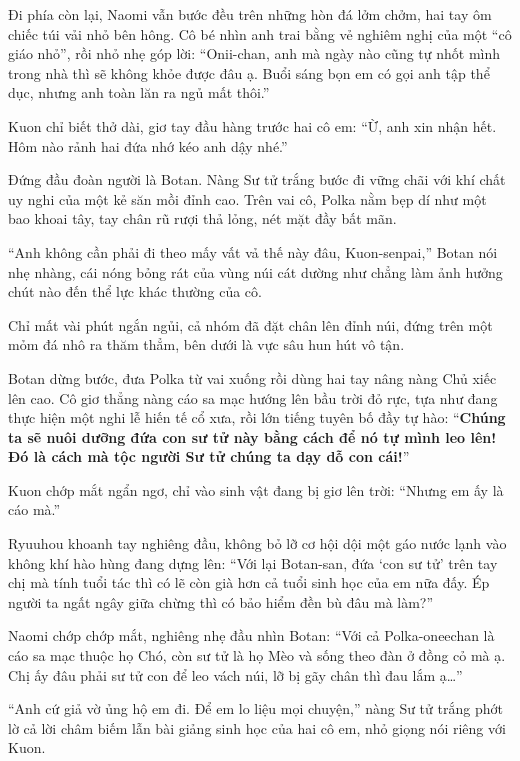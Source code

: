 \documentclass[../main.tex]{subfiles}
\begin{document}
Đi phía còn lại, Naomi vẫn bước đều trên những hòn đá lởm chởm, hai tay ôm chiếc túi vải nhỏ bên hông. Cô bé nhìn anh trai bằng vẻ nghiêm nghị của một ``cô giáo nhỏ'', rồi nhỏ nhẹ góp lời: ``Onii-chan, anh mà ngày nào cũng tự nhốt mình trong nhà thì sẽ không khỏe được đâu ạ. Buổi sáng bọn em có gọi anh tập thể dục, nhưng anh toàn lăn ra ngủ mất thôi.''

Kuon chỉ biết thở dài, giơ tay đầu hàng trước hai cô em: ``Ừ, anh xin nhận hết. Hôm nào rảnh hai đứa nhớ kéo anh dậy nhé.''

Đứng đầu đoàn người là Botan. Nàng Sư tử trắng bước đi vững chãi với khí chất uy nghi của một kẻ săn mồi đỉnh cao. Trên vai cô, Polka nằm bẹp dí như một bao khoai tây, tay chân rũ rượi thả lỏng, nét mặt đầy bất mãn.

``Anh không cần phải đi theo mấy vất vả thế này đâu, Kuon-senpai,'' Botan nói nhẹ nhàng, cái nóng bỏng rát của vùng núi cát dường như chẳng làm ảnh hưởng chút nào đến thể lực khác thường của cô.

Chỉ mất vài phút ngắn ngủi, cả nhóm đã đặt chân lên đỉnh núi, đứng trên một mỏm đá nhô ra thăm thẳm, bên dưới là vực sâu hun hút vô tận.

Botan dừng bước, đưa Polka từ vai xuống rồi dùng hai tay nâng nàng Chủ xiếc lên cao. Cô giơ thẳng nàng cáo sa mạc hướng lên bầu trời đỏ rực, tựa như đang thực hiện một nghi lễ hiến tế cổ xưa, rồi lớn tiếng tuyên bố đầy tự hào: ``\textbf{Chúng ta sẽ nuôi dưỡng đứa con sư tử này bằng cách để nó tự mình leo lên! Đó là cách mà tộc người Sư tử chúng ta dạy dỗ con cái!}''

Kuon chớp mắt ngẩn ngơ, chỉ vào sinh vật đang bị giơ lên trời: ``Nhưng em ấy là cáo mà.''

Ryuuhou khoanh tay nghiêng đầu, không bỏ lỡ cơ hội dội một gáo nước lạnh vào không khí hào hùng đang dựng lên: ``Với lại Botan-san, đứa `con sư tử' trên tay chị mà tính tuổi tác thì có lẽ còn già hơn cả tuổi sinh học của em nữa đấy. Ép người ta ngất ngây giữa chừng thì có bảo hiểm đền bù đâu mà làm?''

Naomi chớp chớp mắt, nghiêng nhẹ đầu nhìn Botan: ``Với cả Polka-oneechan là cáo sa mạc thuộc họ Chó, còn sư tử là họ Mèo và sống theo đàn ở đồng cỏ mà ạ. Chị ấy đâu phải sư tử con để leo vách núi, lỡ bị gãy chân thì đau lắm ạ\dots''

``Anh cứ giả vờ ủng hộ em đi. Để em lo liệu mọi chuyện,'' nàng Sư tử trắng phớt lờ cả lời châm biếm lẫn bài giảng sinh học của hai cô em, nhỏ giọng nói riêng với Kuon.
\end{document}
